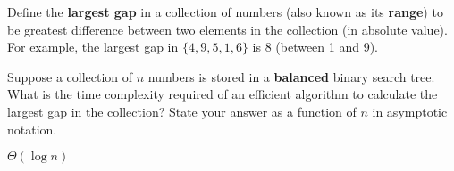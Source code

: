 \begin{prob}
    Define the \textbf{largest gap} in a collection of numbers (also known as its \textbf{range}) to be
    greatest difference between two elements in the collection (in absolute value). For example, the
    largest gap in $\{4, 9, 5, 1, 6\}$ is 8 (between 1 and 9).

    Suppose a collection of $n$ numbers is stored in a \textbf{balanced} binary search tree. What is the
    time complexity required of an efficient algorithm to calculate the largest gap in the collection?
    State your answer as a function of $n$ in asymptotic notation.

    \begin{soln}
        $\Theta(\log n)$
    \end{soln}

\end{prob}
